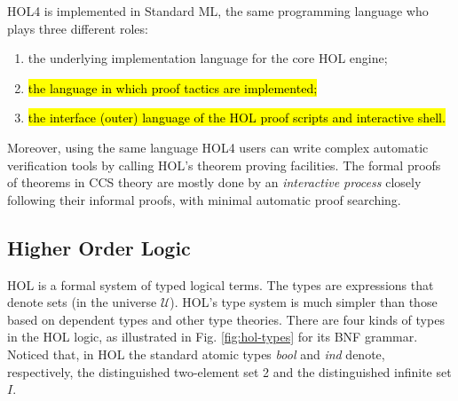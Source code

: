 HOL4 is implemented in Standard ML, the same programming language who
plays three different roles:
\begin{enumerate}
\item the underlying implementation language for the core HOL engine;
\item \hl{the language in which proof tactics are implemented;}
\item \hl{the interface (outer) language of the HOL proof scripts and
  interactive shell.}
\end{enumerate}
Moreover, using the same language HOL4 users can write complex automatic
verification tools by calling HOL's theorem proving
facilities. The formal proofs of theorems in CCS theory
are mostly done by an \emph{interactive process} closely following
their informal proofs, with minimal automatic proof searching.

\subsection{Higher Order Logic}

HOL is a formal system of typed logical terms. The types are expressions that denote sets (in the
universe $\mathcal{U}$). HOL's type system is much simpler than those
based on dependent types and other type theories. There are four kinds of types in the HOL
logic, as illustrated in Fig. \ref{fig:hol-types} for its BNF
grammar. Noticed that, in HOL the standard atomic types \emph{bool} and \emph{ind}
 denote, respectively, the distinguished two-element set 2 and the
distinguished infinite set $I$.

\newlength{\ttX}
\settowidth{\ttX}{\tt X}
\newcommand{\tyvar}{\setlength{\unitlength}{\ttX}\begin{picture}(1,6)
\put(.5,0){\makebox(0,0)[b]{\footnotesize type variables}}
\put(0,1.5){\vector(0,1){4.5}}
\end{picture}}
\newcommand{\tyatom}{\setlength{\unitlength}{\ttX}\begin{picture}(1,6)
\put(.5,2.3){\makebox(0,0)[b]{\footnotesize atomic types}}
\put(.5,3.3){\vector(0,1){2.6}}
\end{picture}}
\newcommand{\funty}{\setlength{\unitlength}{\ttX}\begin{picture}(1,6)
\put(.5,1.5){\makebox(0,0)[b]{\footnotesize function types}}
\put(.5,0){\makebox(0,0)[b]{\footnotesize (domain $\sigma_1$, codomain $\sigma_2$)}}
\put(1,2.5){\vector(0,1){3.5}}
\end{picture}}
\newcommand{\cmpty}{\setlength{\unitlength}{\ttX}\begin{picture}(1,6)
\put(2,3.3){\makebox(0,0)[b]{\footnotesize compound types}}
\put(1.9,4.5){\vector(0,1){1.5}}
\end{picture}}

